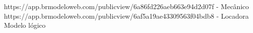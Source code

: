 
https://app.brmodeloweb.com/publicview/6a86fd226aeb663e94d2d07f - Mecânico
https://app.brmodeloweb.com/publicview/6af5a19ae43309563f04bdb8 - Locadora Modelo lógico
